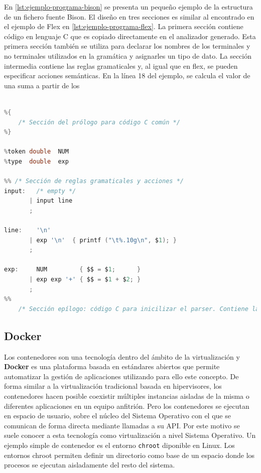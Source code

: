 

En \ref{lst:ejemplo-programa-bison} se presenta un pequeño ejemplo de la estructura de un fichero fuente Bison. El diseño en tres secciones es similar al encontrado en el ejemplo de Flex en \ref{lst:ejemplo-programa-flex}. La primera sección contiene código en lenguaje C que es copiado directamente en el analizador generado. Esta primera sección también se utiliza para declarar los nombres de los terminales y no terminales utilizados en la gramática y asignarles un tipo de dato. La sección intermedia contiene las reglas gramaticales y, al igual que en flex, se pueden especificar acciones semánticas. En la línea 18 del ejemplo, se calcula el valor de una suma a partir de los 

\begin{lstlisting}[language=C,caption={Ejemplo de programa Bison \cite{mit_web_bisonExample}},label=lst:ejemplo-programa-bison]

%{
    /* Sección del prólogo para código C común */
%}

%token double  NUM
%type  double  exp

%% /* Sección de reglas gramaticales y acciones */
input:   /* empty */
       | input line
       ;

line:    '\n'
       | exp '\n'  { printf ("\t%.10g\n", $1); }
       ;
    
exp:     NUM         { $$ = $1;      }
       | exp exp '+' { $$ = $1 + $2; }
       ;
%%
    /* Sección epílogo: código C para inicilizar el parser. Contiene la función main() */
\end{lstlisting}

\subsection{Docker}

Los contenedores son una tecnología dentro del ámbito de la virtualización y \textbf{Docker} es una plataforma basada en estándares abiertos que permite automatizar la gestión de aplicaciones utilizando para ello este concepto. De forma similar a la virtualización tradicional basada en \gls{hipervisores}, los contenedores hacen posible coexistir múltiples instancias aisladas de la misma o diferentes aplicaciones en un  equipo anfitrión. Pero los contenedores se ejecutan en espacio de usuario, sobre el núcleo del Sistema Operativo con el que se comunican de forma directa mediante llamadas a su API. Por este motivo se suele conocer a esta tecnología como virtualización a nivel Sistema Operativo. Un ejemplo simple de contenedor es el entorno \verb|chroot| diponible en Linux. Los entornos chroot permiten definir un directorio como base de un espacio donde los procesos se ejecutan aisladamente del resto del sistema. 

